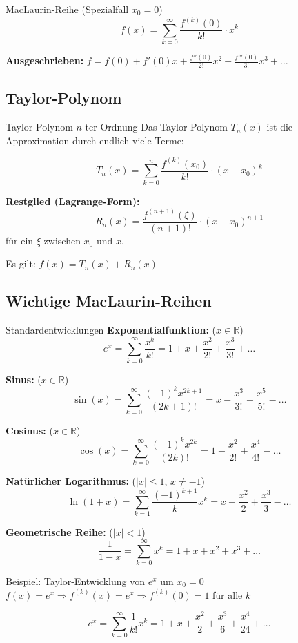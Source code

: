 \documentclass[a4paper,fontsize = 7pt]{scrartcl}
\begin{document}
\begin{mainbox}{MacLaurin-Reihe (Spezialfall $x_0 = 0$)}
$$\boxed{f(x) = \sum_{k=0}^{\infty} \frac{f^{(k)}(0)}{k!} \cdot x^k}$$

\textbf{Ausgeschrieben:} $f = f(0) + f'(0)x + \frac{f''(0)}{2!}x^2 + \frac{f'''(0)}{3!}x^3 + \ldots$
\end{mainbox}

\subsection{Taylor-Polynom}

\begin{mainbox}{Taylor-Polynom $n$-ter Ordnung}
Das Taylor-Polynom $T_n(x)$ ist die Approximation durch endlich viele Terme:

$$T_n(x) = \sum_{k=0}^{n} \frac{f^{(k)}(x_0)}{k!} \cdot (x - x_0)^k$$

\textbf{Restglied (Lagrange-Form):}
$$R_n(x) = \frac{f^{(n+1)}(\xi)}{(n+1)!} \cdot (x - x_0)^{n+1}$$
für ein $\xi$ zwischen $x_0$ und $x$.

Es gilt: $f(x) = T_n(x) + R_n(x)$
\end{mainbox}

\subsection{Wichtige MacLaurin-Reihen}

\begin{mainbox}{Standardentwicklungen}
\textbf{Exponentialfunktion:} ($x \in \mathbb{R}$)
$$e^x = \sum_{k=0}^{\infty} \frac{x^k}{k!} = 1 + x + \frac{x^2}{2!} + \frac{x^3}{3!} + \ldots$$

\textbf{Sinus:} ($x \in \mathbb{R}$)
$$\sin(x) = \sum_{k=0}^{\infty} \frac{(-1)^k x^{2k+1}}{(2k+1)!} = x - \frac{x^3}{3!} + \frac{x^5}{5!} - \ldots$$

\textbf{Cosinus:} ($x \in \mathbb{R}$)
$$\cos(x) = \sum_{k=0}^{\infty} \frac{(-1)^k x^{2k}}{(2k)!} = 1 - \frac{x^2}{2!} + \frac{x^4}{4!} - \ldots$$

\textbf{Natürlicher Logarithmus:} ($|x| \leq 1$, $x \neq -1$)
$$\ln(1+x) = \sum_{k=1}^{\infty} \frac{(-1)^{k+1}}{k} x^k = x - \frac{x^2}{2} + \frac{x^3}{3} - \ldots$$

\textbf{Geometrische Reihe:} ($|x| < 1$)
$$\frac{1}{1-x} = \sum_{k=0}^{\infty} x^k = 1 + x + x^2 + x^3 + \ldots$$
\end{mainbox}

\begin{subbox}{Beispiel: Taylor-Entwicklung von $e^x$ um $x_0 = 0$}
$f(x) = e^x \Rightarrow f^{(k)}(x) = e^x \Rightarrow f^{(k)}(0) = 1$ für alle $k$

$$e^x = \sum_{k=0}^{\infty} \frac{1}{k!} x^k = 1 + x + \frac{x^2}{2} + \frac{x^3}{6} + \frac{x^4}{24} + \ldots$$
\end{subbox}
\end{document}
